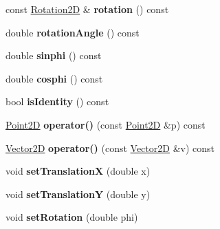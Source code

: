 \begin{DoxyCompactItemize}
const \hyperlink{classRotation2D}{Rotation2D} \& {\bfseries rotation} () const
\item 
\mbox{\label{classTransform2D_afe952ae46903df3ca27b9e942cc6fb1e}} 
double {\bfseries rotation\+Angle} () const
\item 
\mbox{\label{classTransform2D_a523ef8ebc7acfcb28d03f3dcd955a4ca}} 
double {\bfseries sinphi} () const
\item 
\mbox{\label{classTransform2D_ae95634a718340a10a23e30fbba4ee82c}} 
double {\bfseries cosphi} () const
\item 
\mbox{\label{classTransform2D_a3fb4fb40659401243e25a4d4948d7f6c}} 
bool {\bfseries is\+Identity} () const
\item 
\mbox{\label{classTransform2D_aa74e1c8fcb0b821b9172bfefa89fe460}} 
\hyperlink{classTVec2D}{Point2D} {\bfseries operator()} (const \hyperlink{classTVec2D}{Point2D} \&p) const
\item 
\mbox{\label{classTransform2D_a400f563a0e8ea013ef48c3bc2c24b5fc}} 
\hyperlink{classTVec2D}{Vector2D} {\bfseries operator()} (const \hyperlink{classTVec2D}{Vector2D} \&v) const
\item 
\mbox{\label{classTransform2D_a64ca790081bb1325eb744e5e072218bd}} 
void {\bfseries set\+TranslationX} (double x)
\item 
\mbox{\label{classTransform2D_a8a77b6344a224d69975430d7dfd81266}} 
void {\bfseries set\+TranslationY} (double y)
\item 
\mbox{\label{classTransform2D_a1b881f23feb6823b74f3a069b72a10ba}} 
void {\bfseries set\+Rotation} (double phi)
\end{DoxyCompactItemize}
